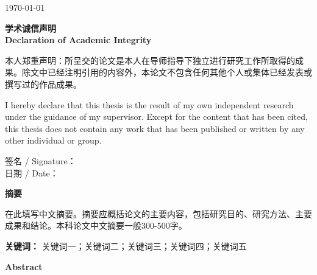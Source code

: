 \documentclass[a4paper,12pt,oneside]{ctexart}
\begin{document}
\vfill
{\large \today}

\raggedright

\newpage
\thispagestyle{empty}
\begin{center}
{\Large \textbf{学术诚信声明}}\\[0.3cm]
{\large \textbf{Declaration of Academic Integrity}}
\end{center}
\vspace{0.5cm}

本人郑重声明：所呈交的论文是本人在导师指导下独立进行研究工作所取得的成果。除文中已经注明引用的内容外，本论文不包含任何其他个人或集体已经发表或撰写过的作品成果。

\vspace{0.5cm}
I hereby declare that this thesis is the result of my own independent research under the guidance of my supervisor. Except for the content that has been cited, this thesis does not contain any work that has been published or written by any other individual or group.

\vspace{2cm}
\begin{flushright}
签名 / Signature：\underline{\hspace{5cm}}\\[12pt]
日期 / Date：\underline{\hspace{5cm}}
\end{flushright}

\newpage
\begin{center}
{\Large \textbf{摘\quad 要}}
\end{center}
\vspace{0.5cm}

在此填写中文摘要。摘要应概括论文的主要内容，包括研究目的、研究方法、主要成果和结论。本科论文中文摘要一般300-500字。

\vspace{1cm}
\noindent\textbf{关键词：} 关键词一；关键词二；关键词三；关键词四；关键词五

\newpage
\begin{center}
{\Large \textbf{Abstract}}
\end{center}
\vspace{0.5cm}
\end{document}
